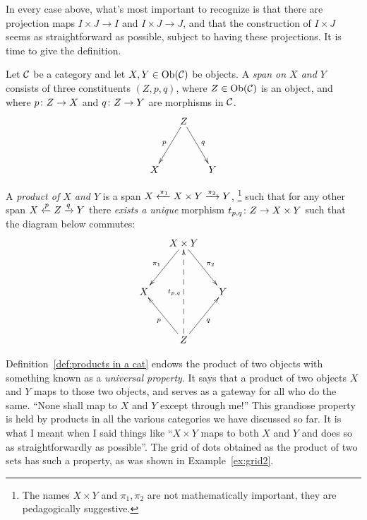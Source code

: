 \documentclass[CT4S-EN-RU]{subfiles}
\begin{document}
\begin{exerciseRUS}
\end{exerciseRUS}

\begin{blockENG}
In every case above, what's most important to recognize is that there are projection maps $I\times J\to I$ and $I\times J\to J$, and that the construction of $I\times J$ seems as straightforward as possible, subject to having these projections. It is time to give the definition.
\end{blockENG}

\begin{blockRUS}
\end{blockRUS}

\begin{definitionENG}\label{def:products in a cat}
Let $\mathcal{C}$ be a category and let $X,Y\in\textnormal{Ob}(\mathcal{C})$ be objects. A {\em span on $X$ and $Y$} consists of three constituents $(Z,p,q)$, where $Z\in\textnormal{Ob}(\mathcal{C})$ is an object, and where $p\colon Z\rightarrow X$ and $q\colon Z\rightarrow Y$ are morphisms in $\mathcal{C}$. 
$$\xymatrix@=15pt{&Z\ar[ldd]_p\ar[rdd]^q\\\\X&&Y}$$   

A {\em product of $X$ and $Y$} is a span $X\xleftarrow{\pi_1}X\times Y\xrightarrow{\pi_2}Y$, \footnote{The names $X\times Y$ and $\pi_1,\pi_2$ are not mathematically important, they are pedagogically suggestive.} such that for any other span $X\xleftarrow{p}Z\xrightarrow{q}Y$ there {\em exists a unique} morphism $t_{p,q}\colon Z\rightarrow X\times Y$ such that the diagram below commutes:
$$
\xymatrix@=15pt{&X\times Y\ar[ldd]_{\pi_1}\ar[rdd]^{\pi_2}\\\\X&&Y\\\\&Z\ar[uul]^{p}\ar[uur]_q\ar@{-->}[uuuu]^{t_{p,q}}}
$$
\end{definitionENG}

\begin{definitionRUS}\label{def:products in a cat}
\end{definitionRUS}

\begin{remarkENG}\label{rem:gateway}
Definition~\ref{def:products in a cat} endows the product of two objects with something known as a {\em universal property}. It says that a product of two objects $X$ and $Y$ maps to those two objects, and serves as a gateway for all who do the same. “None shall map to $X$ and $Y$ except through me!” This grandiose property is held by  products in all the various categories we have discussed so far. It is what I meant when I said things like “$X\times Y$ maps to both $X$ and $Y$ and does so as straightforwardly as possible”.  The grid of dots obtained as the product of two sets has such a property, as was shown in Example~\ref{ex:grid2}.
\end{remarkENG}
\end{document}

